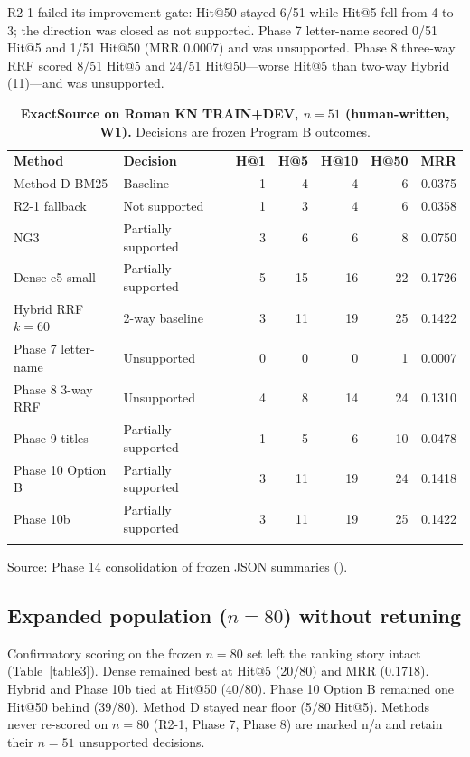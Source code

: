 \documentclass[10pt,letterpaper]{article}
\newlength\savedwidth
\newcommand\thickhline{\noalign{\global\savedwidth\arrayrulewidth\global\arrayrulewidth 2pt}%
\hline
\noalign{\global\arrayrulewidth\savedwidth}}
\begin{document}
R2-1 failed its improvement gate: Hit@50 stayed 6/51 while Hit@5 fell from 4 to 3; the direction was closed as not supported. Phase 7 letter-name scored 0/51 Hit@5 and 1/51 Hit@50 (MRR 0.0007) and was unsupported. Phase 8 three-way RRF scored 8/51 Hit@5 and 24/51 Hit@50---worse Hit@5 than two-way Hybrid (11)---and was unsupported.

\begin{table}[!ht]
\centering
\caption{\textbf{ExactSource on Roman KN TRAIN+DEV, $n = 51$ (human-written, W1).} Decisions are frozen Program B outcomes.}
\label{table2}
\begin{tabular}{llrrrrr}
\thickhline
\textbf{Method} & \textbf{Decision} & \textbf{H@1} & \textbf{H@5} & \textbf{H@10} & \textbf{H@50} & \textbf{MRR} \\
\thickhline
Method-D BM25 & Baseline & 1 & 4 & 4 & 6 & 0.0375 \\
R2-1 fallback & Not supported & 1 & 3 & 4 & 6 & 0.0358 \\
NG3 & Partially supported & 3 & 6 & 6 & 8 & 0.0750 \\
Dense e5-small & Partially supported & 5 & 15 & 16 & 22 & 0.1726 \\
Hybrid RRF $k{=}60$ & 2-way baseline & 3 & 11 & 19 & 25 & 0.1422 \\
Phase 7 letter-name & Unsupported & 0 & 0 & 0 & 1 & 0.0007 \\
Phase 8 3-way RRF & Unsupported & 4 & 8 & 14 & 24 & 0.1310 \\
Phase 9 titles & Partially supported & 1 & 5 & 6 & 10 & 0.0478 \\
Phase 10 Option B & Partially supported & 3 & 11 & 19 & 24 & 0.1418 \\
Phase 10b & Partially supported & 3 & 11 & 19 & 25 & 0.1422 \\
\thickhline
\end{tabular}
\begin{flushleft} Source: Phase 14 consolidation of frozen JSON summaries ().
\end{flushleft}
\end{table}

\subsection*{Expanded population ($n = 80$) without retuning}

Confirmatory scoring on the frozen $n = 80$ set left the ranking story intact (Table~\ref{table3}). Dense remained best at Hit@5 (20/80) and MRR (0.1718). Hybrid and Phase 10b tied at Hit@50 (40/80). Phase 10 Option B remained one Hit@50 behind (39/80). Method D stayed near floor (5/80 Hit@5). Methods never re-scored on $n = 80$ (R2-1, Phase 7, Phase 8) are marked n/a and retain their $n = 51$ unsupported decisions.
\end{document}

